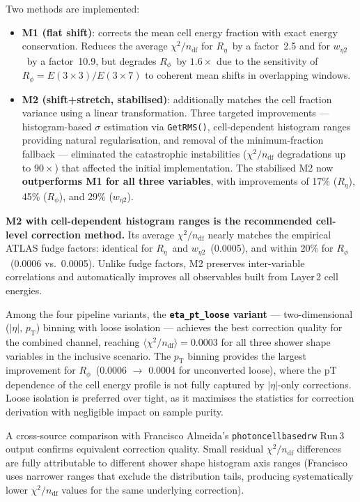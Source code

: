 \documentclass[11pt,a4paper]{article}
\newcommand{\Reta}{\ensuremath{R_{\eta}}}
\newcommand{\Rphi}{\ensuremath{R_{\phi}}}
\newcommand{\weta}{\ensuremath{w_{\eta 2}}}
\newcommand{\abseta}{\ensuremath{|\eta|}}
\newcommand{\chisq}{\ensuremath{\chi^2 / n_{\mathrm{df}}}}
\newcommand{\pt}{\ensuremath{p_{\mathrm{T}}}}
\begin{document}
Two methods are implemented:
\begin{itemize}
  \item \textbf{M1 (flat shift)}: corrects the mean cell energy fraction
        with exact energy conservation.  Reduces the average $\chisq$
        for \Reta\ by a factor~2.5 and for \weta\ by a factor~10.9,
        but degrades \Rphi\ by $1.6\times$ due to the sensitivity of
        $R_\phi = E(3\!\times\!3)/E(3\!\times\!7)$ to coherent mean
        shifts in overlapping windows.
  \item \textbf{M2 (shift+stretch, stabilised)}: additionally matches
        the cell fraction variance using a linear transformation.
        Three targeted improvements --- histogram-based $\sigma$
        estimation via \texttt{GetRMS()}, cell-dependent histogram
        ranges providing natural regularisation, and removal of the
        minimum-fraction fallback --- eliminated the catastrophic
        instabilities ($\chisq$ degradations up to $90\times$) that
        affected the initial implementation.  The stabilised M2 now
        \textbf{outperforms M1 for all three variables}, with
        improvements of 17\% (\Reta), 45\% (\Rphi), and 29\% (\weta).
\end{itemize}

\textbf{M2 with cell-dependent histogram ranges is the recommended
cell-level correction method.}  Its average $\chisq$ nearly matches the
empirical ATLAS fudge factors: identical for \Reta\ and \weta\ (0.0005),
and within 20\% for \Rphi\ (0.0006 vs.\ 0.0005).  Unlike fudge
factors, M2 preserves inter-variable correlations and automatically
improves all observables built from Layer\,2 cell energies.

Among the four pipeline variants, the \textbf{\texttt{eta\_pt\_loose}
variant} --- two-dimensional ($\abseta$, $\pt$) binning with loose
isolation --- achieves the best correction quality for the combined
channel, reaching $\langle\chisq\rangle = 0.0003$ for all three shower
shape variables in the inclusive scenario.  The $\pt$ binning provides
the largest improvement for \Rphi\ (0.0006 $\to$ 0.0004 for unconverted
loose), where the pT dependence of the cell energy profile is not fully
captured by $\abseta$-only corrections.  Loose isolation is preferred
over tight, as it maximises the statistics for correction derivation
with negligible impact on sample purity.

A cross-source comparison with Francisco Almeida's
\texttt{photoncellbasedrw} Run\,3 output confirms equivalent correction
quality.  Small residual $\chisq$ differences are fully attributable to
different shower shape histogram axis ranges (Francisco uses narrower
ranges that exclude the distribution tails, producing systematically
lower $\chisq$ values for the same underlying correction).
\end{document}
